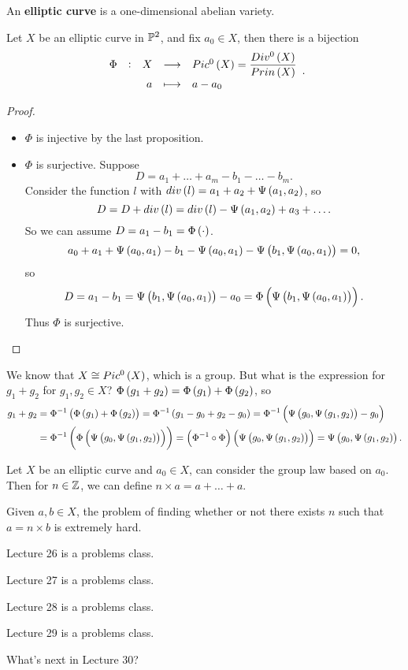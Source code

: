 \begin{definition}
An \textbf{elliptic curve} is a one-dimensional abelian variety.
\end{definition}

\begin{proposition}
Let $ X $ be an elliptic curve in $ \mathbb{P}^2 $, and fix $ a_0 \in X $, then there is a bijection
$$ \function[\Phi]{X}{Pic^0\br{X} = \dfrac{Div^0\br{X}}{Prin\br{X}}}{a}{a - a_0}. $$
\end{proposition}

\begin{proof}
\hfill
\begin{itemize}
\item $ \Phi $ is injective by the last proposition.
\item $ \Phi $ is surjective. Suppose
$$ D = a_1 + \dots + a_m - b_1 - \dots - b_m. $$
Consider the function $ l $ with $ div\br{l} = a_1 + a_2 + \Psi\br{a_1, a_2} $, so
$$ D = D + div\br{l} = div\br{l} - \Psi\br{a_1, a_2} + a_3 + \dots. $$
So we can assume $ D = a_1 - b_1 = \Phi\br{\cdot} $.
$$ a_0 + a_1 + \Psi\br{a_0, a_1} - b_1 - \Psi\br{a_0, a_1} - \Psi\br{b_1, \Psi\br{a_0, a_1}} = 0, $$
so
$$ D = a_1 - b_1 = \Psi\br{b_1, \Psi\br{a_0, a_1}} - a_0 = \Phi\br{\Psi\br{b_1, \Psi\br{a_0, a_1}}}. $$
Thus $ \Phi $ is surjective.
\end{itemize}
\end{proof}

We know that $ X \cong Pic^0\br{X} $, which is a group. But what is the expression for $ g_1 + g_2 $ for $ g_1, g_2 \in X $? $ \Phi\br{g_1 + g_2} = \Phi\br{g_1} + \Phi\br{g_2} $, so
\begin{align*}
g_1 + g_2
& = \Phi^{-1}\br{\Phi\br{g_1} + \Phi\br{g_2}} = \Phi^{-1}\br{g_1 - g_0 + g_2 - g_0} = \Phi^{-1}\br{\Psi\br{g_0, \Psi\br{g_1, g_2}} - g_0} \\
& = \Phi^{-1}\br{\Phi\br{\Psi\br{g_0, \Psi\br{g_1, g_2}}}} = \br{\Phi^{-1} \circ \Phi}\br{\Psi\br{g_0, \Psi\br{g_1, g_2}}} = \Psi\br{g_0, \Psi\br{g_1, g_2}}.
\end{align*}

Let $ X $ be an elliptic curve and $ a_0 \in X $, can consider the group law based on $ a_0 $. Then for $ n \in \mathbb{Z} $, we can define $ n \times a = a + \dots + a $.

\begin{note*}
Given $ a, b \in X $, the problem of finding whether or not there exists $ n $ such that $ a = n \times b $ is extremely hard.
\end{note*}


Lecture 26 is a problems class.


Lecture 27 is a problems class.


Lecture 28 is a problems class.


Lecture 29 is a problems class.


What's next in Lecture 30?


